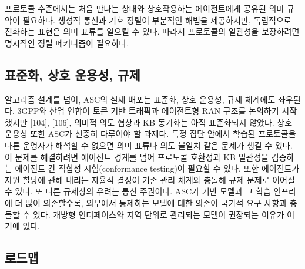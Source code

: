 프로토콜 수준에서는 처음 만나는 상대와 상호작용하는 에이전트에게 공유된 의미 규약이 필요하다. 생성적 통신과 기호 정렬이 부분적인 해법을 제공하지만, 독립적으로 진화하는 표현은 의미 표류를 일으킬 수 있다. 따라서 프로토콜의 일관성을 보장하려면 명시적인 정렬 메커니즘이 필요하다.

\subsection{표준화, 상호 운용성, 규제}

알고리즘 설계를 넘어, ASC의 실제 배포는 표준화, 상호 운용성, 규제 체계에도 좌우된다. 3GPP와 산업 연합이 토큰 기반 트래픽과 에이전트형 RAN 구조를 논의하기 시작했지만 [104], [106], 의미적 의도 협상과 KB 동기화는 아직 표준화되지 않았다. 상호 운용성 또한 ASC가 신중히 다루어야 할 과제다. 특정 집단 안에서 학습된 프로토콜을 다른 운영자가 해석할 수 없으면 의미 표류나 의도 불일치 같은 문제가 생길 수 있다. 이 문제를 해결하려면 에이전트 경계를 넘어 프로토콜 호환성과 KB 일관성을 검증하는 에이전트 간 적합성 시험(conformance testing)이 필요할 수 있다. 또한 에이전트가 자원 할당에 관해 내리는 자율적 결정이 기존 관리 체계와 충돌해 규제 문제로 이어질 수 있다. 또 다른 규제상의 우려는 통신 주권이다. ASC가 기반 모델과 그 학습 인프라에 더 많이 의존할수록, 외부에서 통제하는 모델에 대한 의존이 국가적 요구 사항과 충돌할 수 있다. 개방형 인터페이스와 지역 단위로 관리되는 모델이 권장되는 이유가 여기에 있다.

\subsection{로드맵}

